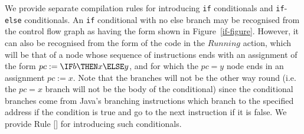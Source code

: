 We provide separate compilation rules for introducing \texttt{if}
conditionals and \texttt{if}-\texttt{else} conditionals.
An \texttt{if} conditional with no else branch may be recognised from
the control flow graph as having the form shown in
Figure~\ref{if-figure}.
However, it can also be recognised from the form of the \Circus{} code
in the $Running$ action, which will be that of a node whose sequence
of instructions ends with an assignment of the form
$pc := \IF b \THEN x \ELSE y$, and for which the $pc = y$ node ends in
an assignment $pc := x$.
Note that the branches will not be the other way round (i.e. 
the $pc = x$ branch will not be the body of the conditional) since the
conditional branches come from Java's branching instructions which
branch to the specified address if the condition is true and go to the
next instruction if it is false.
We provide Rule [] for introducing such
conditionals.
